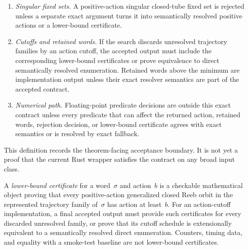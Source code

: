 \begin{unverified}
\begin{definition}
\begin{enumerate}
    output with a zero-time primitive segment is accepted only after it is
    compressed into a positive-time realization, rejected, or justified by a
    separate exact certificate.  Empty tubes and zero-action no-orbit outcomes
    are not capacity values.
  \item \emph{Singular fixed sets.}
    A positive-action singular closed-tube fixed set is rejected unless a
    separate exact argument turns it into semantically resolved positive
    actions or a lower-bound certificate.
  \item \emph{Cutoffs and retained words.}
    If the search discards unresolved trajectory families by an action cutoff,
    the accepted output must include the corresponding lower-bound
    certificates or prove equivalence to direct semantically resolved
    enumeration.  Retained words above the minimum are implementation output
    unless their exact resolver semantics are part of the accepted contract.
  \item \emph{Numerical path.}
    Floating-point predicate decisions are outside this exact contract unless
    every predicate that can affect the returned action, retained words,
    rejection decision, or lower-bound certificate agrees with exact semantics
    or is resolved by exact fallback.
\end{enumerate}
This definition records the theorem-facing acceptance boundary.  It is not yet
a proof that the current Rust wrapper satisfies the contract on any broad input
class.
\end{definition}
\end{unverified}

\begin{unverified}
\begin{definition}\label{def:flow-graph-lower-bound-certificate}
A \emph{lower-bound certificate} for a word~$\sigma$ and action~$b$ is a
checkable mathematical object proving that every positive-action generalized
closed Reeb orbit in the represented trajectory family of~$\sigma$ has action
at least~$b$.  For an action-cutoff implementation, a final accepted output
must provide such certificates for every discarded unresolved family, or prove
that its cutoff schedule is extensionally equivalent to a semantically resolved
direct enumeration.  Counters, timing data, and equality with a smoke-test
baseline are not lower-bound certificates.
\end{definition}
\end{unverified}

